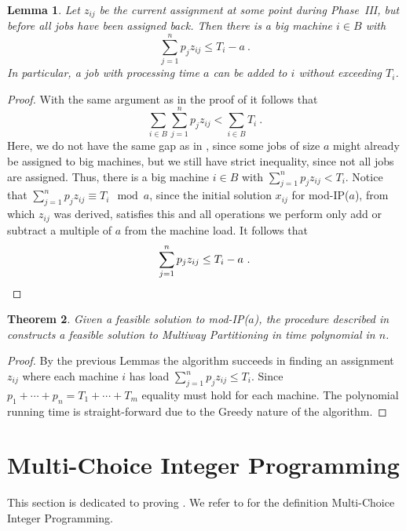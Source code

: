 \documentclass{article}
\newcommand{\mIP}{mod-IP($a$)}
\newtheorem{theorem}{Theorem}
\newtheorem{lemma}[theorem]{Lemma}
\begin{document}
\begin{lemma}
	Let $z_{ij}$ be the current assignment at some point during Phase~III, but before all jobs have been assigned back.
	Then there is a big machine $i\in B$ with
	\begin{equation*}
		\sum_{j=1}^n p_j z_{ij} \le T_i - a \ .
	\end{equation*}
	In particular, a job with processing time $a$ can be added to $i$ without exceeding $T_i$. 
\end{lemma}
\begin{proof}
	With the same argument as in the proof of  it follows that
	\begin{equation*}
		\sum_{i\in B} \sum_{j=1}^n p_j z_{ij} < \sum_{i\in B} T_i \ .
	\end{equation*}
	Here, we do not have the same gap as in , since some jobs of size $a$ might already be
	assigned to big machines, but we still have strict inequality, since not all jobs are assigned.
	Thus, there is a big machine $i\in B$ with $\sum_{j=1}^n p_j z_{ij} < T_i$.
	Notice that $\sum_{j=1}^n p_j z_{ij} \equiv T_i \mod a$, since the initial solution $x_{ij}$ for
	\mIP{}, from which $z_{ij}$ was derived, satisfies this and all operations we perform only add or subtract
	a multiple of $a$ from the machine load.
	It follows that
	\begin{equation*}
		\sum_{j=1}^n p_j z_{ij} \le T_i - a \ . \qedhere
	\end{equation*}
\end{proof}

\begin{theorem}
	Given a feasible solution to \mIP, the procedure described in  constructs a feasible
	solution to Multiway Partitioning in time polynomial in $n$.
\end{theorem}
\begin{proof}
	By the previous Lemmas the algorithm succeeds in finding an assignment $z_{ij}$ where each machine $i$
	has load $\sum_{j=1}^n p_j z_{ij} \le T_i$. Since
	$p_1 + \cdots + p_n = T_1 + \cdots + T_m$ equality must hold for each machine.
	The polynomial running time is straight-forward due to the Greedy nature of the algorithm.
\end{proof}


\section{Multi-Choice Integer Programming}
\label{sec:ilp}
This section is dedicated to proving .
We refer to  for the definition Multi-Choice Integer Programming.
\end{document}
